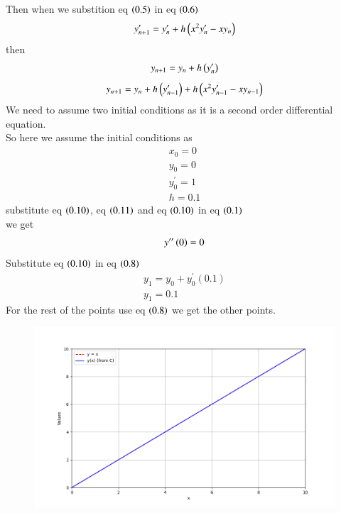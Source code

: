 \documentclass[journal]{IEEEtran}
\begin{document}
  Then when we substition eq $\left(0.5\right)$ in eq $\left(0.6\right)$
\begin{align}
    y'_{n+1}=y'_{n}+h\left(x^{2}y'_{n}-xy_{n}\right)
\end{align}
then 
\begin{align}
    y_{n+1}=y_{n}+h\left(y'_{n}\right)
\end{align}
\begin{align}
  y_{n+1}=y_{n}+h\left(y'_{n-1}\right)+h\left(x^{2}y'_{n-1}-xy_{n-1}\right)
\end{align}
We need to assume two initial conditions as it is a second order differential equation. \\So here we assume the initial conditions as 
\begin{align}
    x_0=0\\y_0=0\\y^\prime_0=1\\h=0.1
\end{align}
substitute eq $\left(0.10\right)$, eq $\left(0.11\right)$ and eq $\left(0.10\right)$ in eq $\left(0.1\right)$\\ we get 
\begin{align}
    y^{\prime\prime}\left(0\right)=0
\end{align}
Substitute eq $\left(0.10\right)$ in eq $\left(0.8\right)$
\begin{align}
    y_1=y_0+y^\prime_0(0.1)\\
    y_1=0.1
\end{align}
For the rest of the points use eq $\left(0.8\right)$ we get the other points.
\begin{figure}[h!]
   \centering
   \includegraphics[width=\columnwidth]{figure/fig.png}
\end{figure}
\end{document}
